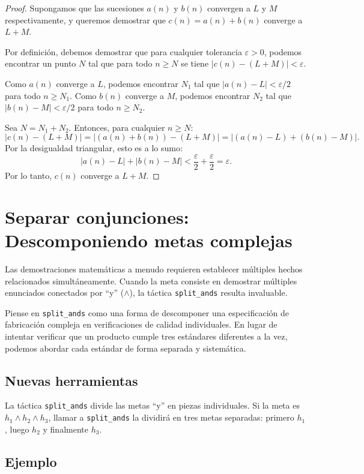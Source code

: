 \begin{proof}
Supongamos que las sucesiones $a(n)$ y $b(n)$ convergen a $L$ y $M$
respectivamente, y queremos demostrar que $c(n) = a(n)+b(n)$ converge a
$L+M$.

Por definición, debemos demostrar que para cualquier tolerancia
$\varepsilon > 0$, podemos encontrar un punto $N$ tal que para todo
$n \geq N$ se tiene $|c(n)-(L+M)| < \varepsilon$.

Como $a(n)$ converge a $L$, podemos encontrar $N_1$ tal que
$|a(n)-L| < \varepsilon/2$ para todo $n \geq N_1$. Como $b(n)$ converge a
$M$, podemos encontrar $N_2$ tal que $|b(n)-M| < \varepsilon/2$ para todo
$n \geq N_2$.

Sea $N = N_1 + N_2$. Entonces, para cualquier $n \geq N$:
\[
  |c(n)-(L+M)| = |(a(n)+b(n))-(L+M)| = |(a(n)-L)+(b(n)-M)|.
\]
Por la desigualdad triangular, esto es a lo sumo:
\[
  |a(n)-L| + |b(n)-M| < \frac{\varepsilon}{2} + \frac{\varepsilon}{2} = \varepsilon.
\]
Por lo tanto, $c(n)$ converge a $L+M$.
\end{proof}

\section{Separar conjunciones: Descomponiendo metas complejas}

Las demostraciones matemáticas a menudo requieren establecer múltiples
hechos relacionados simultáneamente. Cuando la meta consiste en demostrar
múltiples enunciados conectados por ``y'' ($\wedge$), la táctica
\texttt{split\_ands} resulta invaluable.

Piense en \texttt{split\_ands} como una forma de descomponer una
especificación de fabricación compleja en verificaciones de calidad
individuales. En lugar de intentar verificar que un producto cumple tres
estándares diferentes a la vez, podemos abordar cada estándar de forma
separada y sistemática.

\subsection{Nuevas herramientas}

La táctica \texttt{split\_ands} divide las metas ``y'' en piezas
individuales. Si la meta es $h_1 \wedge h_2 \wedge h_3$, llamar a
\texttt{split\_ands} la dividirá en tres metas separadas: primero $h_1$,
luego $h_2$ y finalmente $h_3$.

\subsection{Ejemplo}

